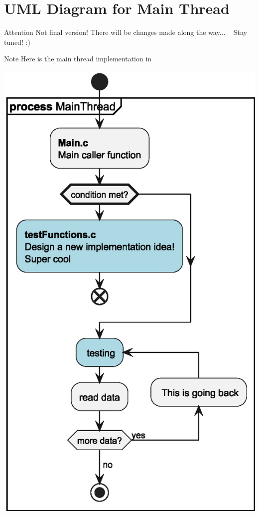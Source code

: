 \chapter{UML Diagram for Main Thread}
\hypertarget{uml__diagram}{}\label{uml__diagram}
\begin{DoxyAttention}{Attention}
Not final version! There will be changes made along the way... ~\newline
 Stay tuned! \+:)
\end{DoxyAttention}
\begin{DoxyNote}{Note}
Here is the main thread implementation in 
\end{DoxyNote}

\begin{DoxyImageNoCaption}
  \mbox{\includegraphics[width=\textwidth,height=\textheight/2,keepaspectratio=true]{inline_umlgraph_2}}
\end{DoxyImageNoCaption}
 